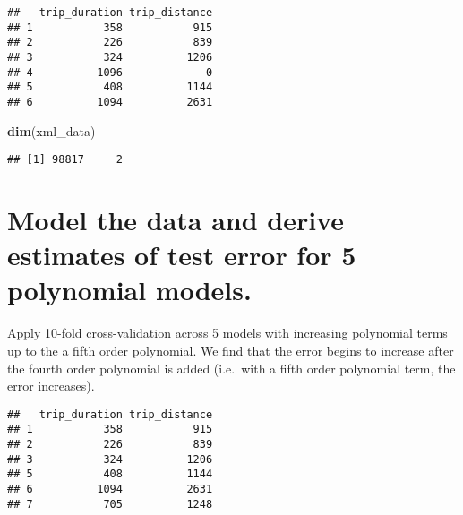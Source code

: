 \documentclass[]{article}
\newenvironment{Shaded}{\begin{snugshade}}{\end{snugshade}}
\newcommand{\KeywordTok}[1]{\textcolor[rgb]{0.13,0.29,0.53}{\textbf{#1}}}
\newcommand{\DecValTok}[1]{\textcolor[rgb]{0.00,0.00,0.81}{#1}}
\newcommand{\StringTok}[1]{\textcolor[rgb]{0.31,0.60,0.02}{#1}}
\newcommand{\OperatorTok}[1]{\textcolor[rgb]{0.81,0.36,0.00}{\textbf{#1}}}
\newcommand{\NormalTok}[1]{#1}
\begin{document}
\begin{verbatim}
##   trip_duration trip_distance
## 1           358           915
## 2           226           839
## 3           324          1206
## 4          1096             0
## 5           408          1144
## 6          1094          2631
\end{verbatim}

\begin{Shaded}
\begin{Highlighting}[]
\KeywordTok{dim}\NormalTok{(xml_data)}
\end{Highlighting}
\end{Shaded}

\begin{verbatim}
## [1] 98817     2
\end{verbatim}

\section{Model the data and derive estimates of test error for 5
polynomial
models.}\label{model-the-data-and-derive-estimates-of-test-error-for-5-polynomial-models.}

Apply 10-fold cross-validation across 5 models with increasing
polynomial terms up to the a fifth order polynomial. We find that the
error begins to increase after the fourth order polynomial is added
(i.e.~with a fifth order polynomial term, the error increases).

\begin{Shaded}
\end{Shaded}

\begin{verbatim}
##   trip_duration trip_distance
## 1           358           915
## 2           226           839
## 3           324          1206
## 5           408          1144
## 6          1094          2631
## 7           705          1248
\end{verbatim}
\end{document}
